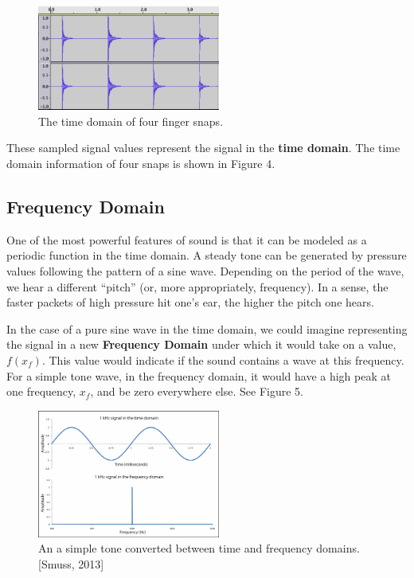 \documentclass[DIV=calc, paper=a4, fontsize=11pt, twocolumn]{scrartcl}   %
\begin{document}
\begin{figure}[h]
\centering
\includegraphics[width=60mm]{figures/snap_timedomain.png}
\caption{The time domain of four finger snaps.}
\label{overflow}
\end{figure}

These sampled signal values represent the signal in the \textbf{time domain}. The time domain information of four snaps is shown in Figure 4.
\subsection{Frequency Domain}
One of the most powerful features of sound is that it can be modeled as a periodic function in the time domain. A steady tone can be generated by pressure values following the pattern of a sine wave. Depending on the period of the wave, we hear a different ``pitch'' (or, more appropriately, frequency). In a sense, the faster packets of high pressure hit one's ear, the higher the pitch one hears.
\par  In the case of a pure sine wave in the time domain, we could imagine representing the signal in a new \textbf{Frequency Domain} under which it would take on a value, $f(x_f)$. This value would indicate if the sound contains a wave at this frequency. For a simple tone wave, in the frequency domain, it would have a high peak at one frequency, $x_f$, and be zero everywhere else. See Figure 5.

\begin{figure}[h]
\centering
\includegraphics[width=60mm]{figures/twodomains.png}
\caption{An a simple tone converted between time and frequency domains.[Smuss, 2013]}
\label{overflow}
\end{figure}
\end{document}
